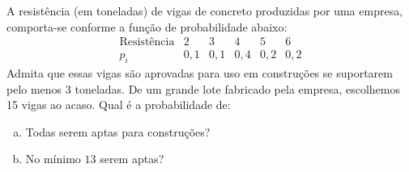%
%


\begin{exercicioBanco}[\valorquestao]
A resistência (em toneladas) de vigas de concreto produzidas por uma empresa, comporta-se conforme a função de probabilidade abaixo:
%
\[
    \begin{array}{c|c|c|c|c|c}
         \text{Resistência} & 2 & 3 & 4 & 5 & 6 \\
         \hline
         p_{i} & 0,1 & 0,1 & 0,4 & 0,2 & 0,2
    \end{array}
\]
%
Admita que essas vigas são aprovadas para uso em construções se suportarem pelo menos \(3\) toneladas. De um grande lote fabricado pela empresa, escolhemos 15 vigas ao acaso. Qual é a probabilidade de:
%
\begin{enumerate}[(a)]
    \item Todas serem aptas para construções?
    \item No mínimo \(13\) serem aptas?
\end{enumerate}
%
\end{exercicioBanco}

